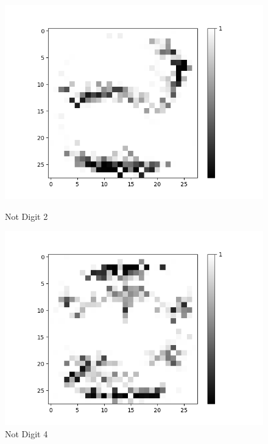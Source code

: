\begin{figure}[H]
\begin{minipage}[b]{0.19\textwidth}
		\includegraphics[width=\textwidth]{AND(LSM)/Negative/Layer0-Neuron-2.png}
		\caption{Not Digit 2}
	\end{minipage}
	\begin{minipage}[b]{0.19\textwidth}
		\includegraphics[width=\textwidth]{AND(LSM)/Negative/Layer0-Neuron-4.png}
		\caption{Not Digit 4}
	\end{minipage}
	\begin{minipage}[b]{0.19\textwidth}

\end{minipage}
\end{figure}
